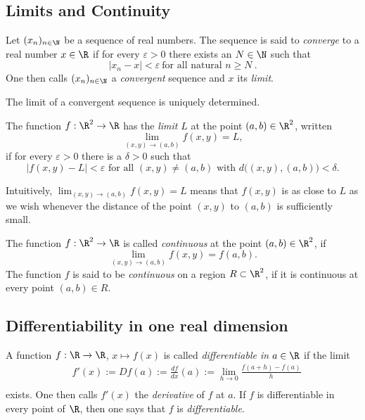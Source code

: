 
\subsection{Limits and Continuity}
\begin{definition}
  Let $(x_n)_{n\in \N}$ be a sequence of real numbers. The sequence is said to 
  \emph{converge} to a real number $x\in \R$ if for every $\varepsilon >0$ 
  there exists an $N\in \N$ such that 
  \[
     | x_n - x | < \varepsilon \: \text{for all natural } n \geq N \ . 
  \]
  One then calls $(x_n)_{n\in \N}$ a \emph{convergent} sequence and 
  $x$ its \emph{limit}. 
\end{definition}

\begin{proposition}
  The limit of a convergent sequence is uniquely determined. 
\end{proposition}

\begin{definition}
  The function $f: \R^2 \rightarrow \R$  has the
  \emph{limit} $L$ at the point $(a,b) \in \R^2$, written 
  \[
    \lim_{(x,y) \rightarrow (a,b)} f(x,y) = L ,
  \]
  if for every $\varepsilon >0$  there is a $\delta >0$ such that 
  \[
      | f (x,y) - L | < \varepsilon \text{ for all $(x,y)\neq (a,b)$ 
      with $d\big ( (x,y),(a,b) \big) < \delta$.}
  \] 
\end{definition}
\begin{remark}
  Intuitively,  $\lim_{(x,y) \rightarrow (a,b)} f(x,y) = L$ means that 
  $f(x,y)$ is as close to $L$ as we wish whenever the distance 
  of the point $(x,y)$ to $(a,b)$ is sufficiently small.  
\end{remark}
\begin{definition}
  The function $f: \R^2 \rightarrow \R$  is called \emph{continuous} 
  at the point $(a,b) \in \R^2$, if 
  \[
    \lim_{(x,y) \rightarrow (a,b)} f(x,y) = f(a,b) .
  \]
  \noindent
  The function $f$ is said to be \emph{continuous}  on a region $R\subset \R^2$, if it is continuous 
  at every point $(a,b) \in R$.
\end{definition}

\subsection{Differentiability in one real dimension}
\begin{definition}
  A function $f:\R \rightarrow \R$, $x \mapsto f(x)$ is called 
  \emph{differentiable in} 
  $a \in \R$ if the limit
\begin{equation*}
  \begin{split}
   & f'(x) := Df (a) := \frac{d f}{d x} (a) := \lim_{h\rightarrow 0} \frac{ f (a+h) - f(a)}{h} \\
  \end{split}
\end{equation*}
exists. One then calls  $f' (x)$ the \emph{derivative} of $f$ at $a$. 
If $f$  is differentiable in every  point of $\R$, then one says that $f$ is \emph{differentiable}.
\end{definition} 



